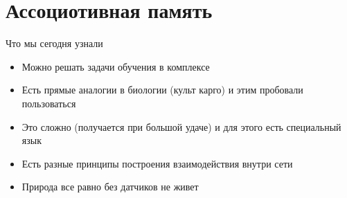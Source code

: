 \documentclass[14pt, fleqn, xcolor={dvipsnames, table}]{beamer}
\begin{document}
\section{Ассоциотивная память} %

\begin{frame}{Что мы сегодня узнали}
\begin{itemize}
  \item Можно решать задачи обучения в комплексе
  \item Есть прямые аналогии в биологии (культ карго) и этим пробовали пользоваться
  \item Это сложно (получается при большой удаче) и для этого есть специальный язык
  \item Есть разные принципы построения взаимодействия внутри сети
  \item Природа все равно без датчиков не живет
\end{itemize}
\end{frame}
\end{document}
